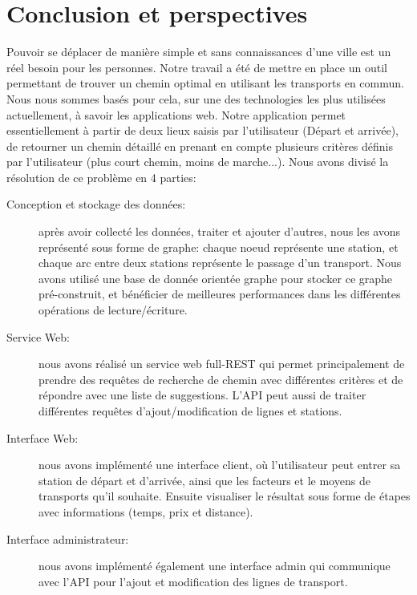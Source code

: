 \chapter{Conclusion et perspectives}

Pouvoir se déplacer de manière simple et sans connaissances d'une ville est un réel besoin pour les personnes. Notre travail a été de mettre en place un outil permettant de trouver un chemin optimal en utilisant les transports en commun.
Nous nous sommes basés pour cela, sur une des technologies les plus utilisées actuellement, à savoir les applications web.\newline
Notre application permet essentiellement à partir de deux lieux saisis par l'utilisateur (Départ et arrivée), de retourner un chemin détaillé en prenant en compte plusieurs critères définis par l'utilisateur (plus court chemin, moins de marche...).\newline
Nous avons divisé la résolution de ce problème en 4 parties:

\begin{description}
\item[Conception et stockage des données:] après avoir collecté les données, traiter et ajouter d'autres, nous les avons représenté sous forme de graphe: chaque noeud représente une station, et chaque arc entre deux stations représente le passage d'un transport.\newline
Nous avons utilisé une base de donnée orientée graphe pour stocker ce graphe pré-construit, et bénéficier de meilleures performances dans les différentes opérations de lecture/écriture.
\item[Service Web:] nous avons réalisé un service web full-REST qui permet principalement de prendre des requêtes de recherche de chemin avec différentes critères et de répondre avec une liste de suggestions. L'API peut aussi de traiter différentes requêtes d'ajout/modification de lignes et stations.
\item[Interface Web:]  nous avons implémenté une interface client, où l'utilisateur peut entrer sa station de départ et d'arrivée, ainsi que les facteurs et le moyens de transports qu'il souhaite.
Ensuite visualiser le résultat sous forme de étapes avec informations (temps, prix et distance).

\item[Interface administrateur:] nous avons implémenté également une interface admin qui communique avec l'API pour l'ajout et modification des lignes de transport.

\end{description}


